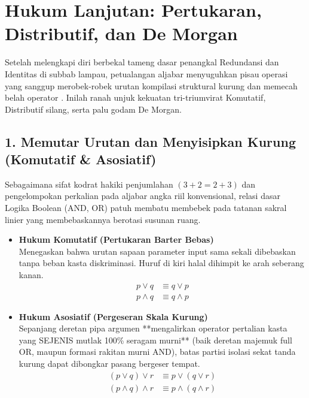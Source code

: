\section{Hukum Lanjutan: Pertukaran, Distributif, dan De Morgan}

Setelah melengkapi diri berbekal tameng dasar penangkal Redundansi dan Identitas di subbab lampau, petualangan aljabar menyuguhkan pisau operasi yang sanggup merobek-robek urutan kompilasi struktural kurung dan memecah belah operator \cite{rosen2019}. Inilah ranah unjuk kekuatan tri-triumvirat Komutatif, Distributif silang, serta palu godam De Morgan.

\subsection{1. Memutar Urutan dan Menyisipkan Kurung (Komutatif \& Asosiatif)}

Sebagaimana sifat kodrat hakiki penjumlahan $(3+2 = 2+3)$ dan pengelompokan perkalian pada aljabar angka riil konvensional, relasi dasar Logika Boolean (AND, OR) patuh membatu membebek pada tatanan sakral linier yang membebaskannya berotasi susunan ruang.

\begin{itemize}
    \item \textbf{Hukum Komutatif (Pertukaran Barter Bebas)} \\
    Menegaskan bahwa urutan sapaan parameter input sama sekali dibebaskan tanpa beban kasta diskriminasi. Huruf di kiri halal dihimpit ke arah seberang kanan.
    \begin{align*}
        p \vee q &\equiv q \vee p \\
        p \wedge q &\equiv q \wedge p 
    \end{align*}

    \item \textbf{Hukum Asosiatif (Pergeseran Skala Kurung)} \\
    Sepanjang deretan pipa argumen **mengalirkan operator pertalian kasta yang SEJENIS mutlak 100\% seragam murni** (baik deretan majemuk full OR, maupun formasi rakitan murni AND), batas partisi isolasi sekat tanda kurung dapat dibongkar pasang bergeser tempat.
    \begin{align*}
        (p \vee q) \vee r &\equiv p \vee (q \vee r) \\
        (p \wedge q) \wedge r &\equiv p \wedge (q \wedge r) 
    \end{align*}
\end{itemize}

